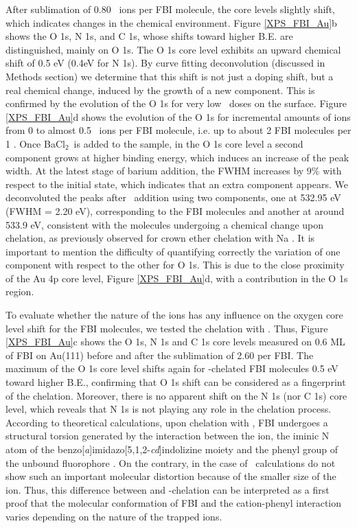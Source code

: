 \documentclass[aps,prl,reprint,longbibliography,superscriptaddress, english]{revtex4-1}
\def\BappCl{BaCl$_2$}
\begin{document}
After sublimation of 0.80 \Bapp\ ions per FBI molecule, the core levels slightly shift, which indicates changes in the chemical environment. Figure {\ref{XPS_FBI_Au}b} shows the O 1s, N 1s, and C 1s, whose shifts toward higher B.E. are distinguished, mainly on O 1s. The O 1s core level exhibits an upward chemical shift of 0.5 eV (0.4eV for N 1s). By curve fitting deconvolution (discussed in Methods section) we determine that this shift is not just a doping shift, but a real chemical change, induced by the growth of a new component. This is confirmed by the evolution of the O 1s for very low \Bapp\ doses on the surface. Figure {\ref{XPS_FBI_Au}d} shows the evolution of the O 1s for incremental amounts of \Bapp ions from 0 to almost 0.5 \Bapp\ ions per FBI molecule, i.e. up to about 2 FBI {molecules} per 1 \Bapp. Once \BappCl\ is added to the sample, in the O 1s core level a second component grows at higher binding energy, which induces an increase of the peak width. At the latest stage of barium addition, the FWHM increases by 9\% with respect to the initial state, which indicates that an extra component appears. We deconvoluted the peaks after \Bapp\ addition using two components, one at 532.95 eV (FWHM = 2.20 eV), corresponding to the FBI molecules and another at around 533.9 eV, consistent with the molecules undergoing a chemical change upon chelation, as previously observed for crown ether chelation with Na \cite{stredansky_-surface_2019}. It is important to mention the difficulty of quantifying correctly the variation of one component with respect to the other for O 1s. This is due to the close proximity of the Au 4p core level, Figure {\ref{XPS_FBI_Au}d}, with a contribution in the O 1s region.

To evaluate whether the nature of the ions has any influence on the oxygen core level shift for the FBI molecules, we tested the chelation with \Nap. Thus, Figure {\ref{XPS_FBI_Au}c} shows the O 1s, N 1s and C 1s core levels measured on 0.6 ML of FBI on Au(111) before and after the sublimation of 2.60 \Nap per FBI. The maximum of the O 1s core level shifts again for \Nap-chelated FBI molecules 0.5 eV toward higher B.E., confirming that O 1s shift can be considered as a fingerprint of the chelation. Moreover, there is no apparent shift on the N 1s (nor C 1s) core level, which reveals that N 1s is not playing any role in the chelation process. According to theoretical calculations, upon chelation with \Bapp, FBI undergoes a structural torsion generated by the interaction between the ion, the iminic N atom of the benzo[\textit{a}]imidazo[5,1,2-\textit{cd}]indolizine moiety and the phenyl group of the unbound fluorophore \cite{rivilla_fluorescent_2020}. On the contrary, in the case of \Nap\ calculations do not show such an important molecular distortion because of the smaller size of the ion. Thus, this difference between \Bapp\- and \Nap-chelation can be interpreted as a first proof that the molecular conformation of FBI and the cation-phenyl interaction varies depending on the nature of the trapped ions. 
\end{document}
